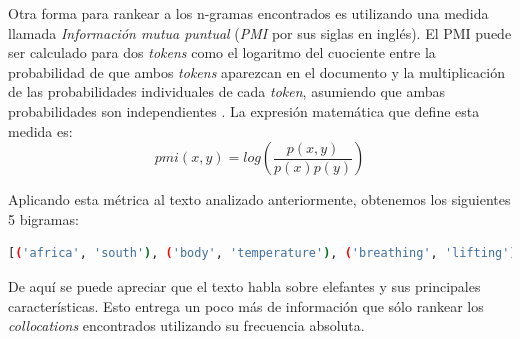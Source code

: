     Otra forma para rankear a los n-gramas encontrados es utilizando una medida llamada \textit{Información mutua puntual} (\textit{PMI} por sus siglas en inglés). El PMI puede ser calculado para dos \textit{tokens} como el logaritmo del cuociente entre la probabilidad de que ambos \textit{tokens} aparezcan en el documento y la multiplicación de las probabilidades individuales de cada \textit{token}, asumiendo que ambas probabilidades son independientes \cite{church1990word}. La expresión matemática que define esta medida es:
    \begin{equation*}
        pmi(x,y) = log\left(\frac{p(x,y)}{p(x)p(y)}\right)
    \end{equation*}
    
    Aplicando esta métrica al texto analizado anteriormente, obtenemos los siguientes 5 bigramas:
    
    \begin{lstlisting}[language=Bash]
    [('africa', 'south'), ('body', 'temperature'), ('breathing', 'lifting'), ('carry', 'great'), ('control', 'body'), ('convex', 'level'), ('ear', 'flaps'), ('elephantidae', 'order'), ('extant', 'terrestrial'), ('family', 'elephantidae')]
    \end{lstlisting}
    De aquí se puede apreciar que el texto habla sobre elefantes y sus principales características. Esto entrega un poco más de información que sólo rankear los \textit{collocations} encontrados utilizando su frecuencia absoluta.
    

